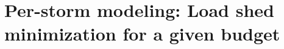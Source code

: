 \documentclass[authoryear,preprint,review,12pt]{elsarticle}\usepackage{amssymb}
\begin{document}
    

\section{Per-storm modeling: Load shed minimization for a given budget} \label{per-storm-model}
\end{document}
